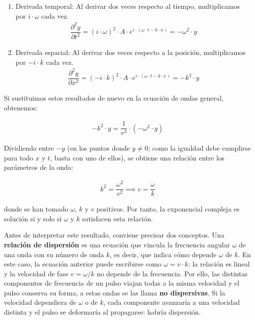 \documentclass[
  spanish,
]{article}
\providecommand{\tightlist}{%
  \setlength{\itemsep}{0pt}\setlength{\parskip}{0pt}}
\begin{document}
\begin{enumerate}
\def\labelenumi{\arabic{enumi}.}
\tightlist
\item
  Derivada temporal: Al derivar dos veces respecto al tiempo,
  multiplicamos por \(i \cdot \omega\) cada vez. \[
  \begin{aligned}
  \dfrac{\partial^2 y}{\partial t^2} = (i \cdot \omega)^2 \cdot A \cdot e^{i \cdot (\omega \cdot t - k \cdot x)} = -\omega^2 \cdot y
  \end{aligned}
  \]
\item
  Derivada espacial: Al derivar dos veces respecto a la posición,
  multiplicamos por \(-i \cdot k\) cada vez. \[
  \begin{aligned}
  \dfrac{\partial^2 y}{\partial x^2} = (-i \cdot k)^2 \cdot A \cdot e^{i \cdot (\omega \cdot t - k \cdot x)} = -k^2 \cdot y
  \end{aligned}
  \]
\end{enumerate}

Si sustituimos estos resultados de nuevo en la ecuación de ondas
general, obtenemos:

\[
\begin{aligned}
-k^2 \cdot y = \dfrac{1}{v^2} \cdot (-\omega^2 \cdot y)
\end{aligned}
\]

Dividiendo entre \(-y\) (en los puntos donde \(y \neq 0\); como la
igualdad debe cumplirse para todo \(x\) y \(t\), basta con uno de
ellos), se obtiene una relación entre los parámetros de la onda:

\[
\begin{aligned}
k^2 = \dfrac{\omega^2}{v^2} \implies v = \dfrac{\omega}{k}
\end{aligned}
\]

donde se han tomado \(\omega\), \(k\) y \(v\) positivos. Por tanto, la
exponencial compleja es solución si y solo si \(\omega\) y \(k\)
satisfacen esta relación.

Antes de interpretar este resultado, conviene precisar dos conceptos.
Una \textbf{relación de dispersión} es una ecuación que vincula la
frecuencia angular \(\omega\) de una onda con su número de onda \(k\),
es decir, que indica cómo depende \(\omega\) de \(k\). En este caso, la
ecuación anterior puede escribirse como \(\omega = v \cdot k\): la
relación es lineal y la velocidad de fase \(v = \omega/k\) no depende de
la frecuencia. Por ello, las distintas componentes de frecuencia de un
pulso viajan todas a la misma velocidad y el pulso conserva su forma; a
estas ondas se las llama \textbf{no dispersivas}. Si la velocidad
dependiera de \(\omega\) o de \(k\), cada componente avanzaría a una
velocidad distinta y el pulso se deformaría al propagarse: habría
dispersión.
\end{document}
